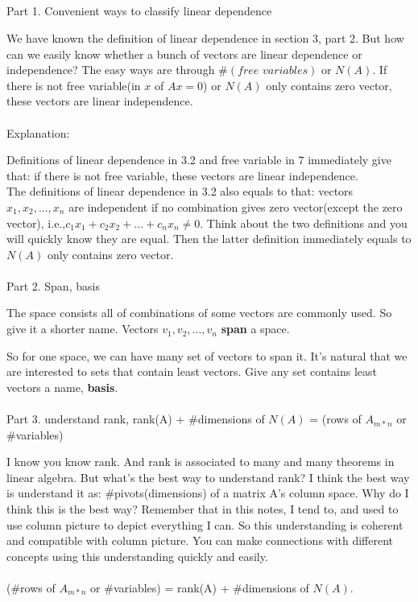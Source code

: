\documentclass{article}
\begin{document}
\begin{spacing}{1.5}
\section{}
Part 1. Convenient ways to classify linear dependence

We have known the definition of linear dependence in section 3, part 2. But how can we easily know whether a bunch of vectors are linear dependence or independence? The easy ways are through $\#(free \,\,variables)$ or $N(A)$. If there is not free variable(in $x$ of $Ax=0$) or $N(A)$ only contains zero vector, these vectors are linear independence.
\\\\Explanation:

Definitions of linear dependence in 3.2 and free variable in 7 immediately give that: if there is not free variable, these vectors are linear independence. \\
The definitions of linear dependence in 3.2 also equals to that: vectors $x_1, x_2, ..., x_n$ are independent if no combination gives zero vector(except the zero vector), i.e.,$c_1x_1 + c_2x_2+...+c_nx_n \neq 0$. Think about the two definitions and you will quickly know they are equal. Then the latter definition immediately equals to $N(A)$ only contains zero vector.
\\\\Part 2. Span, basis

The space consists all of combinations of some vectors are commonly used. So give it a shorter name. Vectors $v_1, v_2, ..., v_n$ {\bfseries span} a space.

So for one space, we can have many set of vectors to span it. It's natural that we are interested to sets that contain least vectors. Give any set contains least vectors a name, {\bfseries basis}.
\\\\Part 3. understand rank, rank(A) + $\#$dimensions of $N(A)$ =  (rows of $A_{m*n}$ or $\#$variables)

I know you know rank. And rank is associated to many and many theorems in linear algebra. But what's the best way to understand rank? I think the best way is understand it as: $\#$pivots(dimensions) of a matrix A's column space. Why do I think this is the best way? Remember that in this notes, I tend to, and used to use column picture to depict everything I can. So this understanding is coherent and compatible with column picture. You can make connections with different concepts using this understanding quickly and easily. 
\\\\(\#rows of $A_{m*n}$ or \#variables) = rank(A) + \#dimensions of $N(A)$.


\end{spacing}
\end{document}
